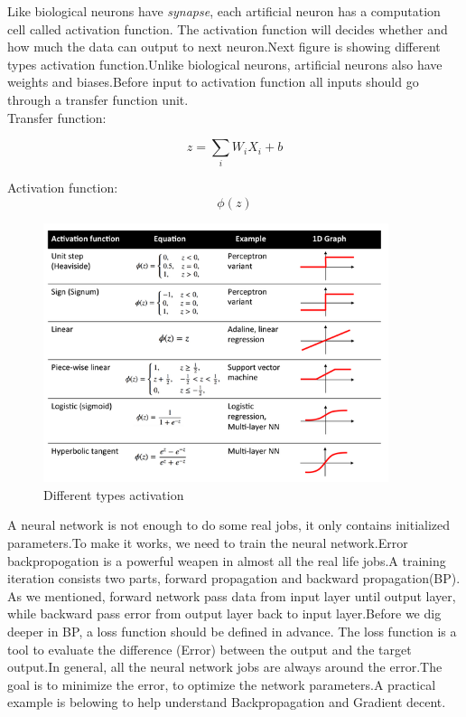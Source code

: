 \documentclass[12pt,a4paper]{report}
\begin{document}
\newpage

Like biological neurons have \textit{synapse}, each artificial neuron has a  computation cell called activation function. The activation function will decides whether and how much the data can output to next neuron.Next figure is showing different types activation function.Unlike biological neurons, artificial neurons also have weights and biases.Before input to activation function all inputs should go through a transfer function unit.\\

Transfer function:

\[z= \sum\limits_{i}W_i X_i +b\]

Activation function:
	\[\phi(z)\]
\begin{figure}[h]
\centering
\includegraphics[width=0.9\textwidth]{activation.png}
\caption{Different types activation}
\end{figure}

\newpage

A neural network is not enough to do some real jobs, it only contains initialized parameters.To make it works, we need to train the neural network.Error backpropogation is a powerful weapen in almost all the real life jobs.A training iteration consists two parts, forward propagation and backward propagation(BP). As we mentioned, forward network pass  data from input layer until output layer, while backward pass error from output layer back to input layer.Before we dig deeper in BP, a loss function should be defined in advance. The loss function is a tool to evaluate  the difference (Error) between the output and the target output.In general, all the neural network jobs are always around the error.The goal is to minimize the error, to optimize the network parameters.A practical example is belowing to help understand Backpropagation and Gradient decent.
\end{document}
